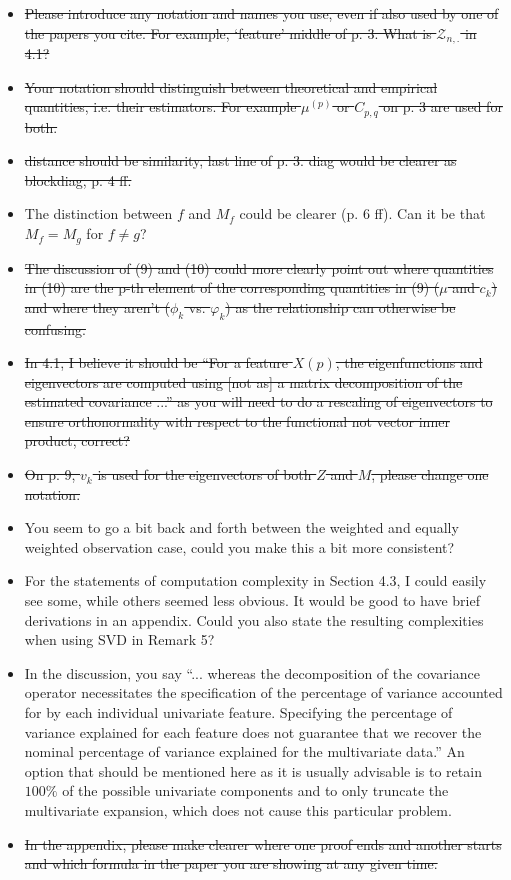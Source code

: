 \documentclass[11pt]{article}
\begin{document}
\begin{itemize}
  \item  \sout{Please introduce any notation and names you use, even if also used by one of the papers you cite. For example, ‘feature’ middle of p. 3. What is $\mathcal{Z}_{n,.}$ in 4.1?}
  \item \sout{Your notation should distinguish between theoretical and empirical quantities, i.e. their estimators. For example $\mu^{(p)}$ or $C_{p,q}$ on p. 3 are used for both.}
  \item \sout{distance should be similarity, last line of p. 3. diag would be clearer as blockdiag, p. 4 ff.}
  \item The distinction between $f$ and $M_f$ could be clearer (p. 6 ff). Can it be that $M_f = M_g$ for $f \neq g$?
  \item \sout{The discussion of (9) and (10) could more clearly point out where quantities in (10) are the p-th element of the corresponding quantities in (9) ($\mu$ and $c_k$) and where they aren't ($\phi_k$ vs. $\varphi_k$) as the relationship can otherwise be confusing.}
  \item \sout{In 4.1, I believe it should be “For a feature $X(p)$, the eigenfunctions and eigenvectors are computed using [not as] a matrix decomposition of the estimated covariance ...” as you will need to do a rescaling of eigenvectors to ensure orthonormality with respect to the functional not vector inner product, correct?}
  \item \sout{On p. 9, $v_k$ is used for the eigenvectors of both $Z$ and $M$, please change one notation.}
  \item You seem to go a bit back and forth between the weighted and equally weighted observation case, could you make this a bit more consistent?
  \item For the statements of computation complexity in Section 4.3, I could easily see some, while others seemed less obvious. It would be good to have brief derivations in an appendix. Could you also state the resulting complexities when using SVD in Remark 5?
  \item In the discussion, you say “... whereas the decomposition of the covariance operator necessitates the specification of the percentage of variance accounted for by each individual univariate feature. Specifying the percentage of variance explained for each feature does not guarantee that we recover the nominal percentage of variance explained for the multivariate data.” An option that should be mentioned here as it is usually advisable is to retain $100\%$ of the possible univariate components and to only truncate the multivariate expansion, which does not cause this particular problem.
  \item \sout{In the appendix, please make clearer where one proof ends and another starts and which formula in the paper you are showing at any given time.}
\end{itemize}
\end{document}
